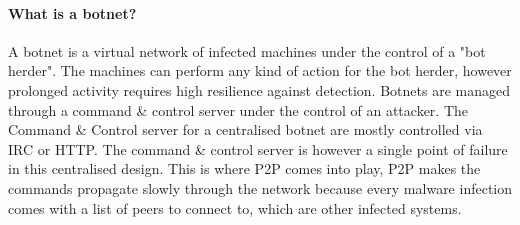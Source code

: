 \paragraph{What is a botnet?}
A botnet is a virtual network of infected machines under the control of a "bot herder". The machines can perform any kind of action for the bot herder, however prolonged activity requires high resilience against detection. Botnets are managed through a command \& control server under the control of an attacker. The Command \& Control server for a centralised botnet are mostly controlled via IRC or HTTP. The command \& control server is however a single point of failure in this centralised design. This is where P2P comes into play, P2P makes the commands propagate slowly through the network because every malware infection comes with a list of peers to connect to, which are other infected systems.